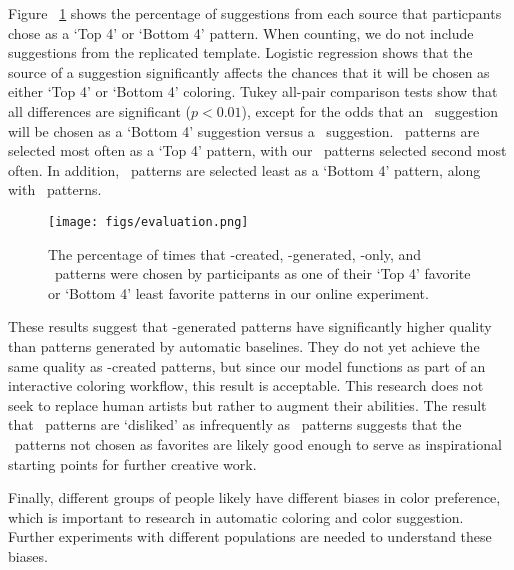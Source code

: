 Figure ~\ref{fig:study} shows the percentage of suggestions from each source that particpants chose as a `Top 4' or `Bottom 4' pattern. When counting, we do not include suggestions from the replicated template. Logistic regression shows that the source of a suggestion significantly affects the chances that it will be chosen as either `Top 4' or `Bottom 4' coloring. Tukey all-pair comparison tests show that all differences are significant ($p < 0.01$), except for the odds that an \artistSource~suggestion will be chosen as a `Bottom 4' suggestion versus a \modelSource~suggestion. \artistSource~patterns are selected most often as a `Top 4' pattern, with our \modelSource~patterns selected second most often. In addition, \modelSource~patterns are selected least as a `Bottom 4' pattern, along with \artistSource~patterns.

\begin{figure}[h!]
  \begin{center}
  \texttt{[image: figs/evaluation.png]}
	\end{center}
\caption{The percentage of times that \artistSource-created, \modelSource-generated, \compatSource-only, and \randomSource~patterns were chosen by participants as one of their `Top 4' favorite or `Bottom 4' least favorite patterns in our online experiment.}

 \label{fig:study}
\end{figure}

These results suggest that \modelSource-generated patterns have significantly higher quality than patterns generated by automatic baselines. They do not yet achieve the same quality as \artistSource-created patterns, but since our model functions as part of an interactive coloring workflow, this result is acceptable. This research does not seek to replace human artists but rather to augment their abilities. The result that \modelSource~patterns are `disliked' as infrequently as \artistSource~patterns suggests that the \modelSource~patterns not chosen as favorites are likely good enough to serve as inspirational starting points for further creative work.

Finally, different groups of people likely have different biases in color preference, which is important to research in automatic coloring and color suggestion. Further experiments with different populations are needed to understand these biases.